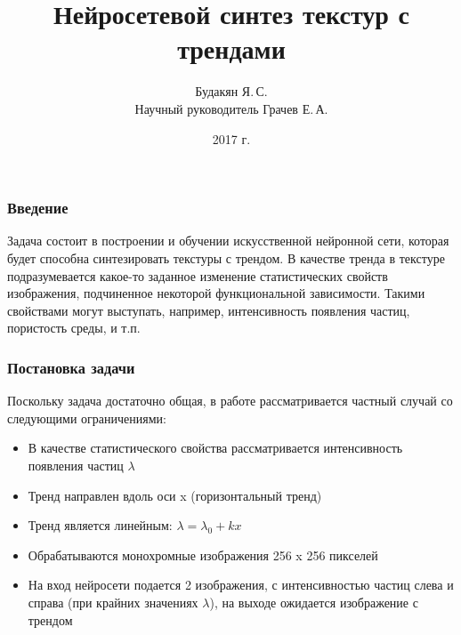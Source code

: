 \documentclass[9pt]{beamer}
\begin{document}
\title{Нейросетевой синтез текстур с трендами}
\author{Будакян Я.\,С. \\ Научный руководитель Грачев Е.\,А.}
\date{2017 г.} 

\maketitle

\begin{frame}\frametitle{Введение}
	Задача состоит в построении и обучении искусственной нейронной сети, которая будет способна синтезировать текстуры с трендом.
	В качестве тренда в текстуре подразумевается какое-то заданное изменение статистических свойств изображения, подчиненное некоторой функциональной зависимости. Такими свойствами могут выступать, например, интенсивность появления частиц, пористость среды, и т.п.
\end{frame}

\begin{frame}\frametitle{Постановка задачи} 
	Поскольку задача достаточно общая, в работе рассматривается частный случай со следующими ограничениями:
	\begin{itemize}
		\item В качестве статистического свойства рассматривается интенсивность появления частиц $\lambda$
		\item Тренд направлен вдоль оси x (горизонтальный тренд)
		\item Тренд является линейным: $ \lambda = \lambda_0 + kx $
		\item Обрабатываются монохромные изображения 256 x 256 пикселей
		\item На вход нейросети подается 2 изображения, с интенсивностью частиц слева и справа (при крайних значениях $\lambda$), на выходе ожидается изображение с трендом
	\end{itemize}
\end{frame}
\end{document}
